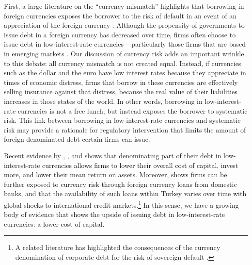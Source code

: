 \documentclass{ar-1col}
\begin{document}
First, a large literature on the ``currency mismatch'' highlights that borrowing in foreign currencies exposes the borrower to the risk of default in an event of an appreciation of the foreign currency \citep[e.g]{EichengreenHausmann1999, cespedes2004balance}. Although the propensity of governments to issue debt in a foreign currency has decreased over time, firms often choose to issue debt in low-interest-rate currencies -- particularly those firms that are based in emerging markets \citep{DuSchreger2017}. Our discussion of currency risk adds an important wrinkle to this debate: all currency mismatch is not created equal. Instead, if currencies such as the dollar and the euro have low interest rates because they appreciate in times of economic distress, firms that borrow in these currencies are effectively selling insurance against that distress, because the real value of their liabilities increases in those states of the world. In other words, borrowing in low-interest-rate currencies is not a free lunch, but instead exposes the borrower to systematic risk. This link between borrowing in low-interest-rate currencies and systematic risk may provide a rationale for regulatory intervention that limits the amount of foreign-denominated debt certain firms can issue.

Recent evidence by \citet{liao2020}, \citet{Richers2020}, and \citet{SalomaoVarela2019} shows that denominating part of their debt in low-interest-rate currencies allows firms to lower their overall cost of capital, invest more, and lower their mean return on assets. Moreover, \citep{KalemliOzcanetal2019} shows firms can be further exposed to currency risk through foreign currency loans from domestic banks, and that the availability of such loans within Turkey varies over time with global shocks to international credit markets.\footnote{A related literature has highlighted the consequences of the currency denomination of corporate debt for the risk of sovereign default \citep{DuSchreger2017, OttonelloPerez2019}.} In this sense, we have a growing body of evidence that shows the upside of issuing debt in low-interest-rate currencies: a lower cost of capital. 
\end{document}
